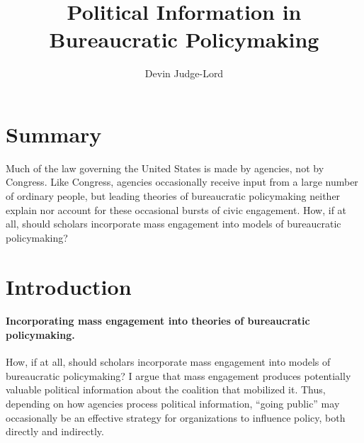 \documentclass{article}
\title{Political Information in Bureaucratic Policymaking}
\author{Devin Judge-Lord} %
\begin{document}
\maketitle
\abstract{}















\newpage
\large
\tableofcontents
 \normalsize

\newpage
\section*{Summary}

Much of the law governing the United States is made by agencies, not by Congress. Like Congress, agencies occasionally receive input from a large number of ordinary people, but leading theories of bureaucratic policymaking neither explain nor account for these occasional bursts of civic engagement.
How, if at all, should scholars incorporate mass engagement into models of bureaucratic policymaking? %


% 

\newpage
\doublespace

\section{Introduction} \label{intro}



\paragraph{Incorporating mass engagement into theories of bureaucratic policymaking.}
How, if at all, should scholars incorporate mass engagement into models of bureaucratic policymaking? 
I argue that mass engagement produces potentially valuable political information about the coalition that mobilized it.
Thus, depending on how agencies process political information, ``going public'' may occasionally be an effective strategy for organizations to influence policy, both directly and indirectly.
\end{document}
